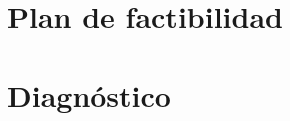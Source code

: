 \documentclass[10pt,aspectratio=169]{beamer}
\newcommand{\pendiente}{\textcolor{accentorange}{\textbf{[pendiente]}}}
\newcommand{\estadoverde}[2][\textwidth]{%
  \begin{beamercolorbox}[wd=#1,sep=0.6ex,rounded=true]{item}
    \textcolor{accentgreen}{$\checkmark$\ \textbf{#2}}
  \end{beamercolorbox}}
\begin{document}
\section{Plan de factibilidad}

%
%

\section{Diagnóstico}
\end{document}
